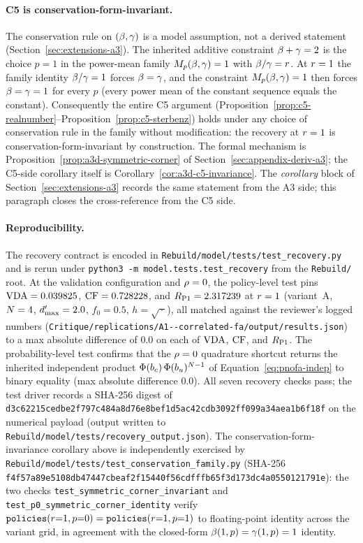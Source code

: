 \paragraph{C5 is conservation-form-invariant.}
The conservation rule on $(\beta, \gamma)$ is a model assumption,
not a derived statement (Section~\ref{sec:extensions-a3}). The
inherited additive constraint $\beta + \gamma = 2$ is the choice
$p = 1$ in the power-mean family $M_p(\beta, \gamma) = 1$ with
$\beta/\gamma = r$. At $r = 1$ the family identity
$\beta/\gamma = 1$ forces $\beta = \gamma$, and the constraint
$M_p(\beta, \gamma) = 1$ then forces $\beta = \gamma = 1$ for
every $p$ (every power mean of the constant sequence equals the
constant). Consequently the entire C5 argument
(Proposition~\ref{prop:c5-realnumber}--Proposition~\ref{prop:c5-sterbenz})
holds under any choice of conservation rule in the family without
modification: the recovery at $r = 1$ is
conservation-form-invariant by construction. The formal mechanism
is Proposition~\ref{prop:a3d-symmetric-corner} of
Section~\ref{sec:appendix-deriv-a3}; the C5-side corollary itself is
Corollary~\ref{cor:a3d-c5-invariance}. The
\emph{corollary} block of Section~\ref{sec:extensions-a3} records the
same statement from the A3 side; this paragraph closes the
cross-reference from the C5 side.

\paragraph{Reproducibility.}
The recovery contract is encoded in
\texttt{Rebuild/model/tests/test\_recovery.py} and is rerun under
\texttt{python3 -m model.tests.test\_recovery} from the
\texttt{Rebuild/} root. At the validation configuration and
$\rho = 0$, the policy-level test pins
$\mathrm{VDA} = 0.039825$, $\mathrm{CF} = 0.728228$, and
$R_{\mathrm{P1}} = 2.317239$ at $r = 1$ (variant~A, $N = 4$,
$d'_{\max} = 2.0$, $f_0 = 0.5$, $h = \sqrt{\,\cdot\,}$), all
matched against the reviewer's logged numbers
(\texttt{Critique/replications/A1{-}{-}correlated{-}fa/output/results.json})
to a max absolute difference of $0.0$ on each of $\mathrm{VDA}$, $\mathrm{CF}$, and
$R_{\mathrm{P1}}$. The probability-level test confirms that the $\rho = 0$
quadrature shortcut returns the inherited independent product
$\Phi(b_c)\,\Phi(b_u)^{N - 1}$ of
Equation~\eqref{eq:pnofa-indep} to binary equality (max absolute
difference $0.0$). All seven recovery checks pass; the test driver
records a SHA-256 digest of
\texttt{d3c62215cedbe2f797c484a8d76e8bef1d5ac42cdb3092ff099a34aea1b6f18f}
on the numerical payload (output written to
\texttt{Rebuild/model/tests/recovery\_output.json}). The
conservation-form-invariance corollary above is independently
exercised by \texttt{Rebuild/model/tests/test\_conservation\_family.py}
(SHA-256 \texttt{f4f57a89e5108db47447cbeaf2f15440f56cdfffb65f3d173dc4a0550121791e}):
the two checks \texttt{test\_symmetric\_corner\_invariant} and
\texttt{test\_p0\_symmetric\_corner\_identity} verify
$\texttt{policies}(r{=}1, p{=}0) = \texttt{policies}(r{=}1, p{=}1)$
to floating-point identity across the variant grid, in agreement
with the closed-form $\beta(1, p) = \gamma(1, p) = 1$ identity.

